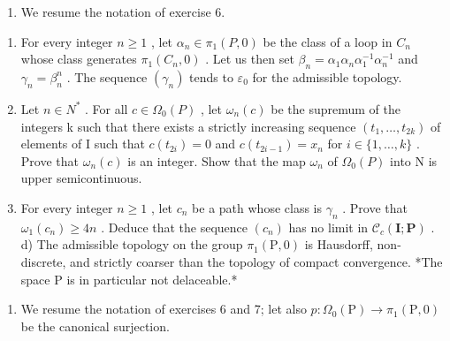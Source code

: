 \begin{enumerate}
\def\labelenumi{\arabic{enumi})}
\setcounter{enumi}{6}
\tightlist
\item
  We resume the notation of exercise 6.
\end{enumerate}

\begin{enumerate}
\def\labelenumi{\alph{enumi})}
\item
  For every integer \(n \geqslant 1\) , let \(\alpha_{n} \in \pi_{1}(P,0)\) be the class of a loop in \(C_{n}\) whose class generates \(\pi_{1}(C_{n},0)\) . Let us then set \(\beta_{n} = \alpha_{1}\alpha_{n}\alpha_{1}^{-1}\alpha_{n}^{-1}\) and \(\gamma_{n} = \beta_{n}^{n}\) . The sequence \((\gamma_{n})\) tends to \(\varepsilon_{0}\) for the admissible topology.
\item
  Let \(n \in N^{*}\) . For all \(c \in \Omega_{0}(P)\) , let \(\omega_{n}(c)\) be the supremum of the integers k such that there exists a strictly increasing sequence \((t_{1}, \ldots, t_{2k})\) of elements of I such that \(c(t_{2i}) = 0\) and \(c(t_{2i-1}) = x_{n}\) for \(i \in \{1, \ldots, k\}\) . Prove that \(\omega_{n}(c)\) is an integer. Show that the map \(\omega_{n}\) of \(\Omega_{0}(P)\) into N is upper semicontinuous.
\item
  For every integer \(n \geqslant 1\) , let \(c_{n}\) be a path whose class is \(\gamma_{n}\) . Prove that \(\omega_{1}(c_{n}) \geqslant 4n\) . Deduce that the sequence \((c_{n})\) has no limit in \(\mathcal{C}_{c}(\mathbf{I};\mathbf{P})\) . d) The admissible topology on the group \(\pi_{1}(\mathrm{P},0)\) is Hausdorff, non-discrete, and strictly coarser than the topology of compact convergence. *The space P is in particular not delaceable.*
\end{enumerate}

\begin{enumerate}
\def\labelenumi{\arabic{enumi})}
\setcounter{enumi}{7}
\tightlist
\item
  We resume the notation of exercises 6 and 7; let also \(p\colon \Omega_{0}(\mathrm{P})\to\pi_1(\mathrm{P},0)\) be the canonical surjection.
\end{enumerate}

